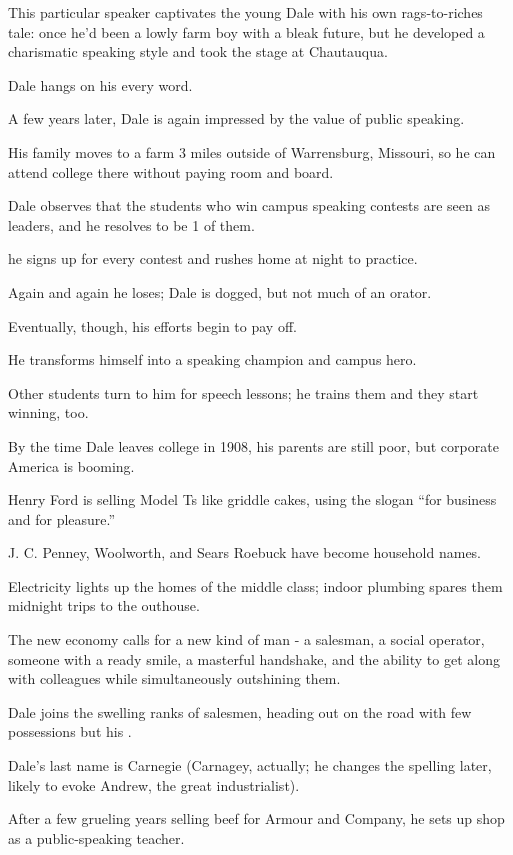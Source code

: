 \documentclass[oneside]{article}
\numberwithin{equation}{section}
\begin{document}
This particular speaker captivates the young Dale with his own rags-to-riches tale: once he'd been a lowly farm boy with a bleak future, but he developed a charismatic speaking style and took the stage at Chautauqua.

Dale hangs on his every word.

%
A few years later, Dale is again impressed by the value of public speaking.

His family moves to a farm 3 miles outside of Warrensburg, Missouri, so he can attend college there without paying room and board.

Dale observes that the students who win campus speaking contests are seen as leaders, and he resolves to be 1 of them.

he signs up for every contest and rushes home at night to practice.

Again and again he loses; Dale is dogged, but not much of an orator.

Eventually, though, his efforts begin to pay off.

He transforms himself into a speaking champion and campus hero.

Other students turn to him for speech lessons; he trains them and they start winning, too.

%
By the time Dale leaves college in 1908, his parents are still poor, but corporate America is booming.

Henry Ford is selling Model Ts like griddle cakes, using the slogan ``for business and for pleasure.''

J. C. Penney, Woolworth, and Sears Roebuck have become household names.

Electricity lights up the homes of the middle class; indoor plumbing spares them midnight trips to the outhouse.

%
The new economy calls for a new kind of man - a salesman, a social operator, someone with a ready smile, a masterful handshake, and the ability to get along with colleagues while simultaneously outshining them.

Dale joins the swelling ranks of salesmen, heading out on the road with few possessions but his .

%
Dale's last name is Carnegie (Carnagey, actually; he changes the spelling later, likely to evoke Andrew, the great industrialist).

After a few grueling years selling beef for Armour and Company, he sets up shop as a public-speaking teacher.
\end{document}

